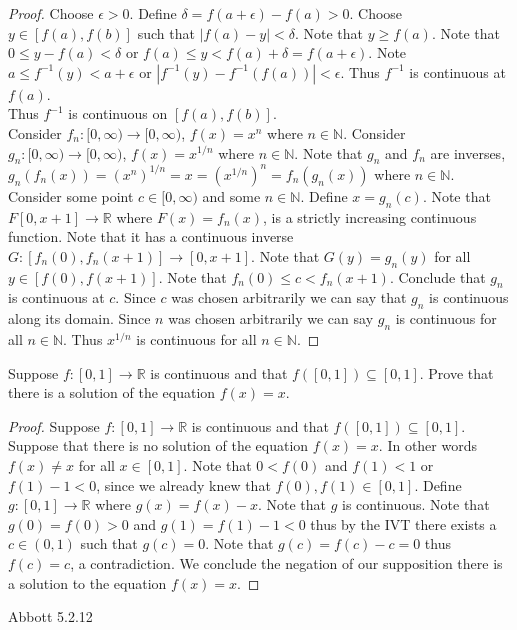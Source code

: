 \documentclass[12pt]{article}
\makeatletter
\theoremstyle{homework}
\newenvironment{exercise}[1]
{\def\@currentlabel{#1}\exercisecore}
{\endexercisecore}
\makeatother
\begin{document}
\begin{proof}
Choose $\epsilon>0$.  Define $\delta=f(a+\epsilon)-f(a)>0$.  Choose $y\in [f(a), f(b)]$ such that $|f(a)-y|<\delta$.  Note that $y\geq f(a)$.  Note that $0 \leq y-f(a)<\delta$ or $f(a) \leq y<f(a)+\delta=f(a+\epsilon)$.  Note $a \leq f^{-1}(y)<a+\epsilon$ or $|f^{-1}(y)-f^{-1}(f(a))|<\epsilon$.  Thus $f^{-1}$ is continuous at $f(a)$.\\
Thus $f^{-1}$ is continuous on $[f(a),f(b)]$.\\
Consider $f_n:[0,\infty)\rightarrow [0,\infty)$, $f(x)=x^n$ where $n\in\mathbb{N}$.  Consider $g_n:[0,\infty)\rightarrow [0,\infty)$, $f(x)=x^{1/n}$ where $n\in\mathbb{N}$.  Note that $g_n$ and $f_n$ are inverses, $g_n (f_n(x))=(x^n)^{1/n}=x=(x^{1/n})^n=f_n (g_n (x))$ where $n\in\mathbb{N}$.  Consider some point $c\in [0,\infty)$ and some $n\in\mathbb{N}$.  Define $x=g_n(c)$.  Note that $F [0,x+1]\rightarrow \mathbb{R}$ where $F(x)=f_n(x)$, is a strictly increasing continuous function.  Note that it has a continuous inverse $G : [f_n(0),f_n(x+1)]\rightarrow [0,x+1]$.  Note that $G(y)=g_n(y)$ for all $y\in [f(0),f(x+1)]$.  Note that $f_n(0)\leq c<f_n(x+1)$.  Conclude that $g_n$ is continuous at $c$.  Since $c$ was chosen arbitrarily we can say that $g_n$ is continuous along its domain.  Since $n$ was chosen arbitrarily we can say $g_n$ is continuous for all $n\in\mathbb{N}$.  Thus $x^{1/n}$ is continuous for all $n\in\mathbb{N}$.
\end{proof}
\begin{exercise} 8
Suppose $f : [0,1] \rightarrow\mathbb{R}$ is continuous and that $f ([0,1]) \subseteq [0,1]$.  Prove that there is a solution of the equation $f (x) = x$.
\end{exercise}
\begin{proof}
Suppose $f : [0,1] \rightarrow\mathbb{R}$ is continuous and that $f ([0,1]) \subseteq [0,1]$.  Suppose that there is no solution of the equation $f (x) = x$.  In other words $f(x)\neq x$ for all $x\in [0,1]$.  Note that $0<f(0)$ and $f(1)<1$ or $f(1)-1<0$, since we already knew that $f(0),f(1)\in[0,1]$.  Define $g:[0,1]\rightarrow \mathbb{R}$ where $g(x)=f(x)-x$.  Note that $g$ is continuous.  Note that $g(0)=f(0)>0$ and $g(1)=f(1)-1<0$ thus by the IVT there exists a $c\in (0,1)$ such that $g(c)=0$.  Note that $g(c)=f(c)-c=0$ thus $f(c)=c$, a contradiction.  We conclude the negation of our supposition there is a solution to the equation $f (x) = x$.
\end{proof}
\begin{exercise} 9
Abbott 5.2.12
\end{exercise}
\end{document}
